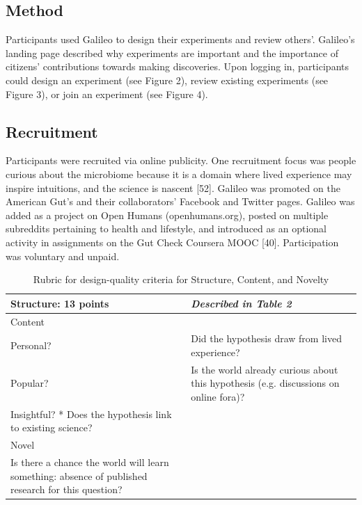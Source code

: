 \subsection{Method}
Participants used Galileo to design their experiments and review others’. Galileo’s landing page described why experiments are important and the importance of citizens’ contributions towards making discoveries. Upon logging in, participants could design an experiment (see Figure 2), review existing experiments (see Figure 3), or join an experiment (see Figure 4). 

\subsection{Recruitment}
Participants were recruited via online publicity. One recruitment focus was people curious about the microbiome because it is a domain where lived experience may inspire intuitions, and the science is nascent [52]. Galileo was promoted on the American Gut’s and their collaborators’ Facebook and Twitter pages. Galileo was added as a project on Open Humans (openhumans.org), posted on multiple subreddits pertaining to health and lifestyle, and introduced as an optional activity in assignments on the Gut Check Coursera MOOC [40]. Participation was voluntary and unpaid. 


\vspace{0.25in}
\begin{table}[!ht]
\caption[]{Rubric for design-quality criteria for Structure, Content, and Novelty}

\vspace{-0.25in}
\begin{center}
\begin{tabular}{|p{1in}|p{2in}|p{3in}|}

\hline
Structure: 13 points &  \textit{Described in Table 2} \\

\hline
Content  & \\
\hline
Personal? & Did the hypothesis draw from lived experience? \\
Popular? & Is the world already curious about this hypothesis (e.g. discussions on online fora)?  \\
Insightful? * Does the hypothesis link to existing science?  \\

\hline
Novel  &  \\
\hline
Is there a chance the world will learn something: absence of published research for this question? &  \\

\hline
\end{tabular}
\end{center}
\label{tab:rubric2}
\end{table}

